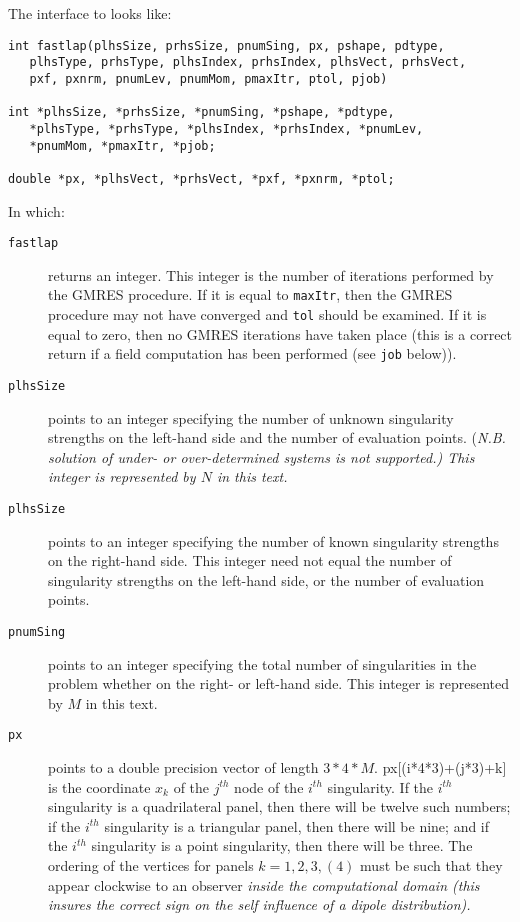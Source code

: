 The interface to \fas looks like:

\begin{verbatim}
int fastlap(plhsSize, prhsSize, pnumSing, px, pshape, pdtype,
   plhsType, prhsType, plhsIndex, prhsIndex, plhsVect, prhsVect,
   pxf, pxnrm, pnumLev, pnumMom, pmaxItr, ptol, pjob)

int *plhsSize, *prhsSize, *pnumSing, *pshape, *pdtype, 
   *plhsType, *prhsType, *plhsIndex, *prhsIndex, *pnumLev, 
   *pnumMom, *pmaxItr, *pjob;

double *px, *plhsVect, *prhsVect, *pxf, *pxnrm, *ptol;

\end{verbatim}
\noindent
In which:
\begin{description}
\item[{\tt fastlap}] returns an integer.  This integer is the number of
iterations performed by the GMRES procedure.  If it is equal to
{\tt maxItr}, then the GMRES procedure may not have converged and
{\tt tol} should be examined.  If it is equal to zero, then no GMRES
iterations have taken place (this is a correct return if a field
computation has been performed (see {\tt job} below)).

\item[{\tt plhsSize}] points to an integer specifying the number of unknown
singularity strengths on the left-hand side and the number of evaluation
points. (\it N.B. \rm solution of under- or 
over-determined systems is not supported.)  This integer is represented by 
$N$ in this text.

\item[{\tt plhsSize}] points to an integer specifying the number of known 
singularity strengths on the right-hand side.  This integer need not equal
the number of singularity strengths on the left-hand side, or the number
of evaluation points.

\item[{\tt pnumSing}] points to an integer specifying the total number of 
singularities in the problem whether on the right- or left-hand side. 
This integer is represented by $M$ in this text.

\item[{\tt px}] points to a double precision vector of length 
$3*4*M$. px[(i*4*3)+(j*3)+k] is the coordinate $x_k$ of 
the $j^{th}$ node of the $i^{th}$ singularity.  
If the  $i^{th}$ 
singularity is a quadrilateral panel, then there will be twelve such 
numbers; if the $i^{th}$ singularity is a triangular panel, then there 
will be nine; and if the  $i^{th}$ singularity is a point singularity, 
then there will be three.  The ordering of the vertices for panels 
$k=1,2,3,(4)$ must be such that they appear clockwise to an observer 
\it inside \rm the computational domain (this insures the correct 
sign on the self influence of a dipole distribution).  


\end{description}
